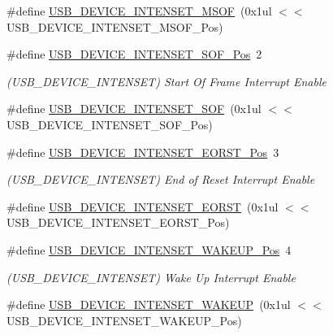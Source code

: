 \begin{DoxyCompactItemize}
\#define \mbox{\hyperlink{group___s_a_m_d21___u_s_b_ga9945869b0b6f326002518fbbe0278e6c}{U\+S\+B\+\_\+\+D\+E\+V\+I\+C\+E\+\_\+\+I\+N\+T\+E\+N\+S\+E\+T\+\_\+\+M\+S\+OF}}~(0x1ul $<$$<$ U\+S\+B\+\_\+\+D\+E\+V\+I\+C\+E\+\_\+\+I\+N\+T\+E\+N\+S\+E\+T\+\_\+\+M\+S\+O\+F\+\_\+\+Pos)
\item 
\#define \mbox{\hyperlink{group___s_a_m_d21___u_s_b_ga144eafc8845cb6e24bf1404da0f42875}{U\+S\+B\+\_\+\+D\+E\+V\+I\+C\+E\+\_\+\+I\+N\+T\+E\+N\+S\+E\+T\+\_\+\+S\+O\+F\+\_\+\+Pos}}~2
\begin{DoxyCompactList}\small\item\em (U\+S\+B\+\_\+\+D\+E\+V\+I\+C\+E\+\_\+\+I\+N\+T\+E\+N\+S\+ET) Start Of Frame Interrupt Enable \end{DoxyCompactList}\item 
\#define \mbox{\hyperlink{group___s_a_m_d21___u_s_b_ga0e2f84d4b397eb9540e3c68cbc10f272}{U\+S\+B\+\_\+\+D\+E\+V\+I\+C\+E\+\_\+\+I\+N\+T\+E\+N\+S\+E\+T\+\_\+\+S\+OF}}~(0x1ul $<$$<$ U\+S\+B\+\_\+\+D\+E\+V\+I\+C\+E\+\_\+\+I\+N\+T\+E\+N\+S\+E\+T\+\_\+\+S\+O\+F\+\_\+\+Pos)
\item 
\#define \mbox{\hyperlink{group___s_a_m_d21___u_s_b_gad41e2a9ed51dcb882cf4810257631116}{U\+S\+B\+\_\+\+D\+E\+V\+I\+C\+E\+\_\+\+I\+N\+T\+E\+N\+S\+E\+T\+\_\+\+E\+O\+R\+S\+T\+\_\+\+Pos}}~3
\begin{DoxyCompactList}\small\item\em (U\+S\+B\+\_\+\+D\+E\+V\+I\+C\+E\+\_\+\+I\+N\+T\+E\+N\+S\+ET) End of Reset Interrupt Enable \end{DoxyCompactList}\item 
\#define \mbox{\hyperlink{group___s_a_m_d21___u_s_b_ga0fce016e4da5eee33701eb4aa510c518}{U\+S\+B\+\_\+\+D\+E\+V\+I\+C\+E\+\_\+\+I\+N\+T\+E\+N\+S\+E\+T\+\_\+\+E\+O\+R\+ST}}~(0x1ul $<$$<$ U\+S\+B\+\_\+\+D\+E\+V\+I\+C\+E\+\_\+\+I\+N\+T\+E\+N\+S\+E\+T\+\_\+\+E\+O\+R\+S\+T\+\_\+\+Pos)
\item 
\#define \mbox{\hyperlink{group___s_a_m_d21___u_s_b_ga3703aaf4d2395b3b6aaeca49fa1ea1e0}{U\+S\+B\+\_\+\+D\+E\+V\+I\+C\+E\+\_\+\+I\+N\+T\+E\+N\+S\+E\+T\+\_\+\+W\+A\+K\+E\+U\+P\+\_\+\+Pos}}~4
\begin{DoxyCompactList}\small\item\em (U\+S\+B\+\_\+\+D\+E\+V\+I\+C\+E\+\_\+\+I\+N\+T\+E\+N\+S\+ET) Wake Up Interrupt Enable \end{DoxyCompactList}\item 
\#define \mbox{\hyperlink{group___s_a_m_d21___u_s_b_gad05970fc167a431aae27eca9e2a1b291}{U\+S\+B\+\_\+\+D\+E\+V\+I\+C\+E\+\_\+\+I\+N\+T\+E\+N\+S\+E\+T\+\_\+\+W\+A\+K\+E\+UP}}~(0x1ul $<$$<$ U\+S\+B\+\_\+\+D\+E\+V\+I\+C\+E\+\_\+\+I\+N\+T\+E\+N\+S\+E\+T\+\_\+\+W\+A\+K\+E\+U\+P\+\_\+\+Pos)

\end{DoxyCompactItemize}
